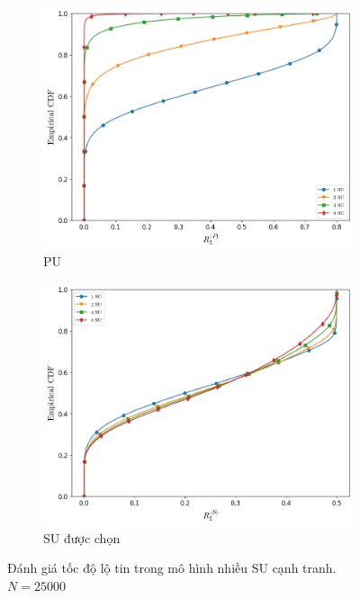 \documentclass[../main.tex]{subfiles}
\begin{document}
\begin{figure}
\centering
\captionsetup{justification=centering}

\begin{subfigure}{.8\textwidth}
\centering
\captionsetup{justification=centering}
\includegraphics[width=1\linewidth]{Figures/multisus-rlp.png}
\caption{PU}
\label{fig:Multiuser:RLP}
\end{subfigure}

\begin{subfigure}{.8\textwidth}
\centering
\includegraphics[width=1\linewidth]{Figures/multisus-rls.png}
\caption{SU được chọn}
\label{fig:Multiuser:RLS}
\end{subfigure}

\caption{Đánh giá tốc độ lộ tin trong mô hình nhiều SU cạnh tranh. $N=25000$}
\end{figure}
\end{document}
